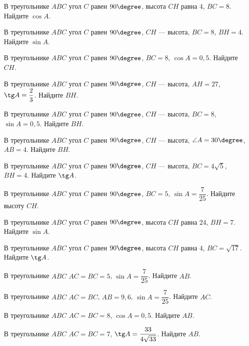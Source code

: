 \begin{class}[number=7]
	\begin{listofex}
		\item В треугольнике \( ABC \) угол \( C \) равен \( 90\degree \), высота \( CH \) равна \( 4 \), \( BC=8 \). Найдите \( \cos A \).
		\item В треугольнике \( ABC \) угол \( C \) равен \( 90\degree \), \( CH \) --- высота, \( BC=8 \), \( BH=4 \). Найдите \( \sin A \).
		\item В треугольнике \( ABC \) угол \( C \) равен \( 90\degree \), \( BC=8 \),  \( \cos A=0,5 \). Найдите \( CH \).
		\item В треугольнике \( ABC \) угол \( C \) равен \( 90\degree \), \( CH \) --- высота, \( AH=27 \), \( \tg A=\dfrac{2}{3} \).  Найдите \( BH \).
		\item В треугольнике \( ABC \) угол \( C \) равен \( 90\degree \), \( CH \) --- высота, \( BC=8 \), \( \sin A=0,5 \). Найдите \( BH \).
		\item В треугольнике \( ABC \) угол \( C \) равен \( 90\degree \), \( CH \) --- высота, \( \angle A=30\degree \), \( AB=4 \). Найдите \( BH \).
		\item В треугольнике \( ABC \) угол \( C \) равен \( 90\degree \), \( CH \) --- высота, \( BC=4\sqrt{5} \), \( BH=4 \). Найдите \( \tg A \).
		\item В треугольнике \( ABC \) угол \( C \) равен \( 90\degree \), \( BC=5 \),  \( \sin A=\dfrac{7}{25} \).  Найдите высоту \( CH \).
		\item В треугольнике \( ABC \) угол \( C \) равен \( 90\degree \), высота \( CH \) равна \( 24 \), \( BH=7 \). Найдите \( \sin A \).
		\item В треугольнике \( ABC \) угол \( C \) равен \( 90\degree \), высота \( CH \) равна \( 4 \), \( BC=\sqrt{17} \). Найдите \( \tg A \).
		\item В треугольнике \( ABC \) \( AC=BC=5 \),  \( \sin A=\dfrac{7}{25} \).  Найдите \( AB \).
		\item В треугольнике \( ABC \) \( AC=BC \), \( AB=9,6 \), \( \sin A=\dfrac{7}{25} \).  Найдите \( AC \).
		\item В треугольнике \( ABC \) \( AC=BC=8 \), \( \cos A=0,5 \). Найдите \( AB \).
		\item В треугольнике \( ABC \) \( AC=BC=7 \), \( \tg A=\dfrac{33}{4\sqrt{33}} \).  Найдите \( AB \).
	\end{listofex}
\end{class}

